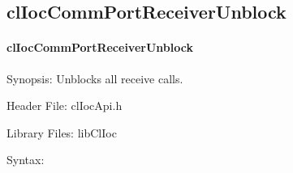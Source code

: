 \begin{flushleft}
\subsection{clIocCommPortReceiverUnblock}
\hypertarget{pageIOC110}{}\paragraph{cl\-Ioc\-Comm\-Port\-Receiver\-Unblock}\label{pageIOC110}
\begin{Desc}
\item[Synopsis: ]Unblocks all receive calls.\end{Desc}
\begin{Desc}
\item[Header File:]clIocApi.h\end{Desc}
\begin{Desc}
\item[Library Files:]libClIoc\end{Desc}
\begin{Desc}
\item[Syntax: ]


\end{Desc}
\end{flushleft}
